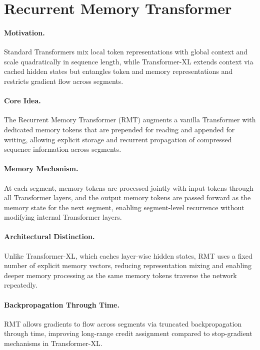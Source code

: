\documentclass[12pt]{article}
\begin{document}
\psetheader %

\section*{Recurrent Memory Transformer}

\paragraph{Motivation.}
Standard Transformers mix local token representations with global context and scale quadratically in sequence
length, while Transformer-XL extends context via cached hidden states but entangles token and memory
representations and restricts gradient flow across segments.

\paragraph{Core Idea.}
The Recurrent Memory Transformer (RMT) augments a vanilla Transformer with dedicated memory tokens that are
prepended for reading and appended for writing, allowing explicit storage and recurrent propagation of
compressed sequence information across segments.

\paragraph{Memory Mechanism.}
At each segment, memory tokens are processed jointly with input tokens through all Transformer layers, and
the output memory tokens are passed forward as the memory state for the next segment, enabling segment-level
recurrence without modifying internal Transformer layers.

\paragraph{Architectural Distinction.}
Unlike Transformer-XL, which caches layer-wise hidden states, RMT uses a fixed number of explicit memory
vectors, reducing representation mixing and enabling deeper memory processing as the same memory tokens
traverse the network repeatedly.

\paragraph{Backpropagation Through Time.}
RMT allows gradients to flow across segments via truncated backpropagation through time, improving long-range
credit assignment compared to stop-gradient mechanisms in Transformer-XL.
\end{document}
